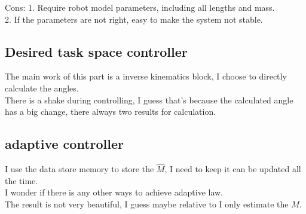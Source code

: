 \documentclass{article}
\begin{document}
Cons:
1. Require robot model parameters, including all lengths and mass.\\
2. If the parameters are not right, easy to make the system not stable.\\

\subsection{Desired task space controller}
The main work of this part is a inverse kinematics block, I choose to directly calculate the angles.\\
There is a shake during controlling, I guess that's because the calculated angle has a big change, there always two results for calculation.\\


\subsection{adaptive controller}
I use the data store memory to store the $\hat{M}$, I need to keep it can be updated all the time.\\

I wonder if there is any other ways to achieve adaptive law.\\

The result is not very beautiful, I guess maybe relative to I only estimate the $M$.\\ 
\end{document}
